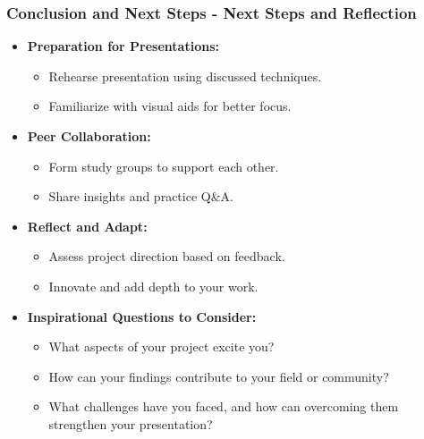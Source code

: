 \documentclass[aspectratio=169]{beamer}
\begin{document}
\begin{frame}[fragile]
    \frametitle{Conclusion and Next Steps - Next Steps and Reflection}
    \begin{itemize}
        \item \textbf{Preparation for Presentations:}
        \begin{itemize}
            \item Rehearse presentation using discussed techniques.
            \item Familiarize with visual aids for better focus.
        \end{itemize}
        
        \item \textbf{Peer Collaboration:}
        \begin{itemize}
            \item Form study groups to support each other.
            \item Share insights and practice Q\&A.
        \end{itemize}
        
        \item \textbf{Reflect and Adapt:}
        \begin{itemize}
            \item Assess project direction based on feedback.
            \item Innovate and add depth to your work.
        \end{itemize}
        
        \item \textbf{Inspirational Questions to Consider:}
        \begin{itemize}
            \item What aspects of your project excite you?
            \item How can your findings contribute to your field or community?
            \item What challenges have you faced, and how can overcoming them strengthen your presentation?
        \end{itemize}
    \end{itemize}
\end{frame}
\end{document}

